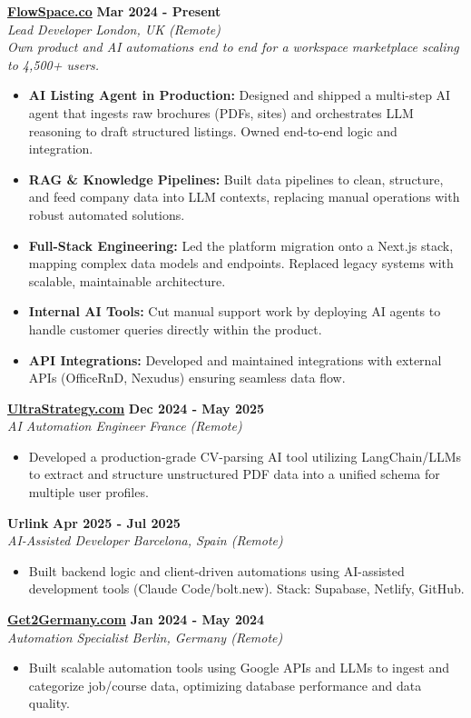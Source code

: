 \documentclass[a4paper,10pt]{article}
\newcommand{\role}[4]{%
 \textbf{#1} \hfill \textbf{#2}\\[1pt]%
 \textit{#3} \hfill \textit{#4}\\[2pt]%
}
\begin{document}
\role{\href{https://flowspace.co}{FlowSpace.co}}{Mar 2024 - Present}{Lead Developer}{London, UK (Remote)}
\textit{Own product and AI automations end to end for a workspace marketplace scaling to 4,500+ users.}
\begin{itemize}
 \item \textbf{AI Listing Agent in Production:} Designed and shipped a multi-step AI agent that ingests raw brochures (PDFs, sites) and orchestrates LLM reasoning to draft structured listings. Owned end-to-end logic and integration.
 \item \textbf{RAG & Knowledge Pipelines:} Built data pipelines to clean, structure, and feed company data into LLM contexts, replacing manual operations with robust automated solutions.
 \item \textbf{Full-Stack Engineering:} Led the platform migration onto a Next.js stack, mapping complex data models and endpoints. Replaced legacy systems with scalable, maintainable architecture.
 \item \textbf{Internal AI Tools:} Cut manual support work by deploying AI agents to handle customer queries directly within the product.
 \item \textbf{API Integrations:} Developed and maintained integrations with external APIs (OfficeRnD, Nexudus) ensuring seamless data flow.
\end{itemize}

\role{\href{https://ultrastrategy.com}{UltraStrategy.com}}{Dec 2024 - May 2025}{AI Automation Engineer}{France (Remote)}
\begin{itemize}
 \item Developed a production-grade CV-parsing AI tool utilizing LangChain/LLMs to extract and structure unstructured PDF data into a unified schema for multiple user profiles.
\end{itemize}

\role{Urlink}{Apr 2025 - Jul 2025}{AI-Assisted Developer}{Barcelona, Spain (Remote)}
\begin{itemize}
 \item Built backend logic and client-driven automations using AI-assisted development tools (Claude Code/bolt.new). Stack: Supabase, Netlify, GitHub.
\end{itemize}

\role{\href{https://get2germany.com}{Get2Germany.com}}{Jan 2024 - May 2024}{Automation Specialist}{Berlin, Germany (Remote)}
\begin{itemize}
 \item Built scalable automation tools using Google APIs and LLMs to ingest and categorize job/course data, optimizing database performance and data quality.
\end{itemize}
\end{document}
